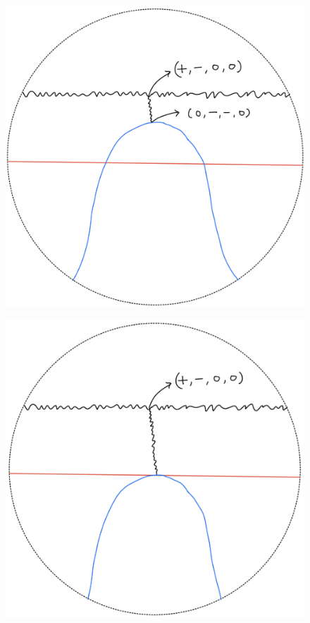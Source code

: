 \begin{definition}
\begin{enumerate}
\begin{itemize}
\begin{figure}[H]
    \caption{}
    \label{fig:your-label}
\end{figure}
\begin{figure}[H]
    \centering
    \includegraphics[scale = 0.95]{diagrams/lemma2/19.png} 
    \caption{}
    \label{fig:your-label}
\end{figure}
\begin{figure}[H]
    \centering
    \includegraphics[scale = 0.95]{diagrams/lemma2/20.png} 

\end{figure}
\end{itemize}
\end{enumerate}
\end{definition}
